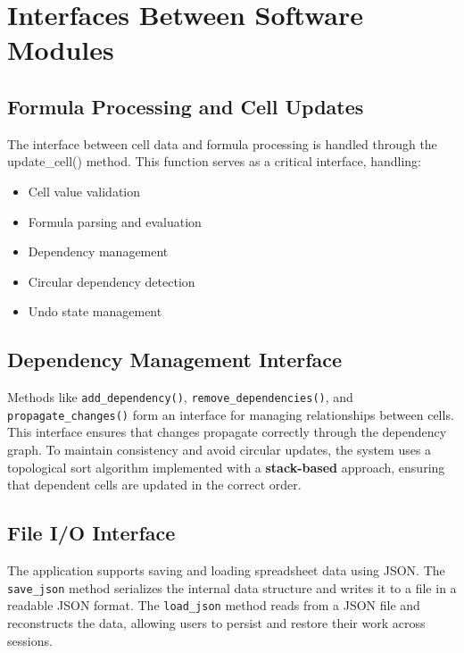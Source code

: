 \documentclass[a4paper,12pt]{article}
\begin{document}
\section{ Interfaces Between Software Modules}

\subsection{Formula Processing and Cell Updates}
The interface between cell data and formula processing is handled through the update\_cell() method.
This function serves as a critical interface, handling:
\begin{itemize}
    \item Cell value validation
    \vspace{-3mm}
\item Formula parsing and evaluation
\vspace{-3mm}
\item Dependency management
\vspace{-3mm}
\item Circular dependency detection
\vspace{-3mm}
\item Undo state management
\vspace{-3mm}
\end{itemize}
\subsection{Dependency Management Interface}
Methods like \texttt{add\_dependency()}, \texttt{remove\_dependencies()}, and \texttt{propagate\_changes()} form an interface for managing relationships between cells. This interface ensures that changes propagate correctly through the dependency graph. To maintain consistency and avoid circular updates, the system uses a topological sort algorithm implemented with a \textbf{stack-based} approach, ensuring that dependent cells are updated in the correct order.


\subsection{File I/O Interface}

The application supports saving and loading spreadsheet data using JSON. The \texttt{save\_json} method serializes the internal data structure and writes it to a file in a readable JSON format. The \texttt{load\_json} method reads from a JSON file and reconstructs the data, allowing users to persist and restore their work across sessions.
\end{document}
